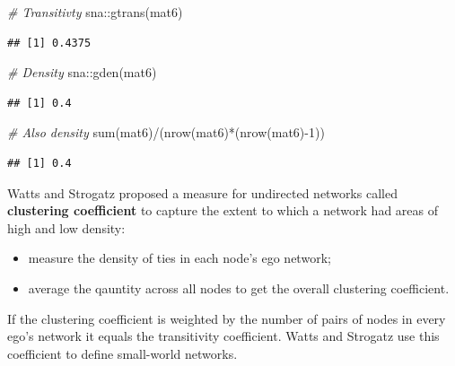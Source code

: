 \documentclass[
  notitlepage,
  onecolumn,
  openany]{book}
\newenvironment{Shaded}{\begin{snugshade}}{\end{snugshade}}
\newcommand{\CommentTok}[1]{\textcolor[rgb]{0.56,0.35,0.01}{\textit{#1}}}
\newcommand{\DecValTok}[1]{\textcolor[rgb]{0.00,0.00,0.81}{#1}}
\newcommand{\FunctionTok}[1]{\textcolor[rgb]{0.00,0.00,0.00}{#1}}
\newcommand{\NormalTok}[1]{#1}
\newcommand{\SpecialCharTok}[1]{\textcolor[rgb]{0.00,0.00,0.00}{#1}}
\providecommand{\tightlist}{%
  \setlength{\itemsep}{0pt}\setlength{\parskip}{0pt}}
\begin{document}
\begin{Shaded}
\begin{Highlighting}[]
\CommentTok{\# Transitivty}
\NormalTok{sna}\SpecialCharTok{::}\FunctionTok{gtrans}\NormalTok{(mat6)}
\end{Highlighting}
\end{Shaded}

\begin{verbatim}
## [1] 0.4375
\end{verbatim}

\begin{Shaded}
\begin{Highlighting}[]
\CommentTok{\# Density}
\NormalTok{sna}\SpecialCharTok{::}\FunctionTok{gden}\NormalTok{(mat6)}
\end{Highlighting}
\end{Shaded}

\begin{verbatim}
## [1] 0.4
\end{verbatim}

\begin{Shaded}
\begin{Highlighting}[]
\CommentTok{\# Also density}
\FunctionTok{sum}\NormalTok{(mat6)}\SpecialCharTok{/}\NormalTok{(}\FunctionTok{nrow}\NormalTok{(mat6)}\SpecialCharTok{*}\NormalTok{(}\FunctionTok{nrow}\NormalTok{(mat6)}\SpecialCharTok{{-}}\DecValTok{1}\NormalTok{))}
\end{Highlighting}
\end{Shaded}

\begin{verbatim}
## [1] 0.4
\end{verbatim}

Watts and Strogatz proposed a measure for undirected networks called \textbf{clustering coefficient} to capture the extent to which a network had areas of high and low density:

\begin{itemize}
\tightlist
\item
  measure the density of ties in each node's ego network;
\item
  average the qauntity across all nodes to get the overall clustering coefficient.
\end{itemize}

If the clustering coefficient is weighted by the number of pairs of nodes in every ego's network it equals the transitivity coefficient. Watts and Strogatz use this coefficient to define small-world networks.
\end{document}

